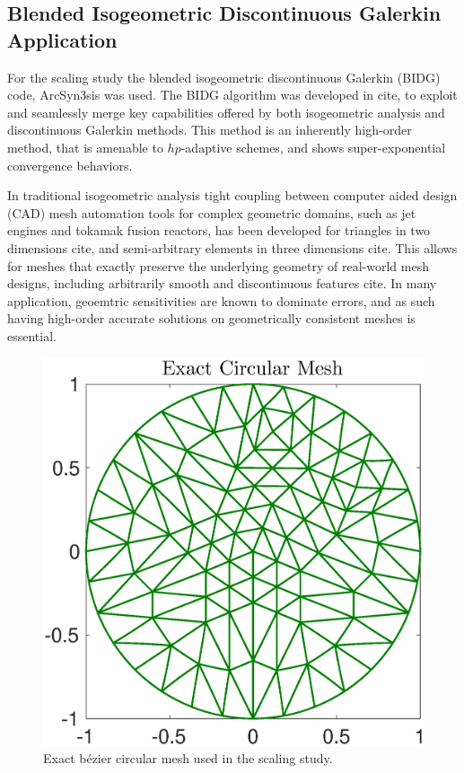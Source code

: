 \subsection{Blended Isogeometric Discontinuous Galerkin Application}
\label{sec:isogeometric}

For the scaling study the blended isogeometric discontinuous Galerkin (BIDG) code, ArcSyn3sis was used.  The BIDG algorithm was developed in cite, to exploit and seamlessly merge key capabilities offered by both isogeometric analysis and discontinuous Galerkin methods. This method is an inherently high-order method, that is amenable to $hp$-adaptive schemes, and shows super-exponential convergence behaviors.

In traditional isogeometric analysis tight coupling between computer aided design (CAD) mesh automation tools for complex geometric domains, such as jet engines and tokamak fusion reactors, has been developed for triangles in two dimensions cite, and semi-arbitrary elements in three dimensions cite.    This allows for meshes that exactly preserve the underlying geometry of real-world mesh designs, including arbitrarily smooth and discontinuous features cite.  In many application, geoemtric sensitivities are known to dominate errors, and as such having high-order accurate solutions on geometrically consistent meshes is essential.


\begin{figure}[h]
\begin{center}
\includegraphics[width=0.8\linewidth]{./bidg_data/168_circ}
\end{center}
\vspace*{-.5cm}
\caption{Exact b\'{e}zier circular mesh used in the scaling study.}
\label{fig:dns_scaling}
\end{figure}


